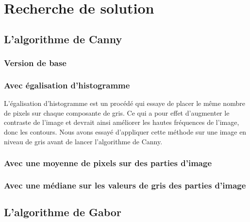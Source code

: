 \section{Recherche de solution}

\subsection{L'algorithme de Canny}

\subsubsection{Version de base}

\subsubsection{Avec égalisation d'histogramme}
L'égalisation d'histogramme est un procédé qui essaye de placer le même nombre de pixels
sur chaque composante de gris. Ce qui a pour effet d'augmenter le contraste de l'image
et devrait ainsi améliorer les hautes fréquences de l'image, donc les contours. Nous avons
essayé d'appliquer cette méthode sur une image en niveau de gris avant de lancer l'algorithme
de Canny.

\subsubsection{Avec une moyenne de pixels sur des parties d'image}

\subsubsection{Avec une médiane sur les valeurs de gris des parties d'image}

\subsection{L'algorithme de Gabor}